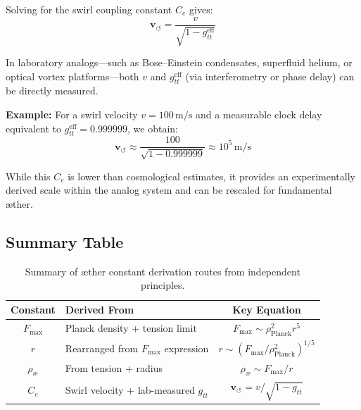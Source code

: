         Solving for the swirl coupling constant $C_e$ gives:
        \begin{equation}
            \mathbf{v}_{\scriptscriptstyle\boldsymbol{\circlearrowleft}} = \frac{v}{\sqrt{1 - g_{tt}^{\text{eff}}}}
        \end{equation}

        In laboratory analogs—such as Bose–Einstein condensates, superfluid helium, or optical vortex platforms—both $v$ and $g_{tt}^{\text{eff}}$ (via interferometry or phase delay) can be directly measured.

        \textbf{Example:} For a swirl velocity $v = 100 \, \text{m/s}$ and a measurable clock delay equivalent to $g_{tt}^{\text{eff}} = 0.999999$, we obtain:
        \begin{equation}
            \mathbf{v}_{\scriptscriptstyle\boldsymbol{\circlearrowleft}} \approx \frac{100}{\sqrt{1 - 0.999999}} \approx 10^5 \, \text{m/s}
        \end{equation}

        While this $C_e$ is lower than cosmological estimates, it provides an experimentally derived scale within the analog system and can be rescaled for fundamental æther.

        \subsection{ Summary Table}

        \begin{table}[H]
        \centering
        \renewcommand{\arraystretch}{1.2}
        \begin{tabular}{|c|l|c|}
        \hline
        \textbf{Constant} & \textbf{Derived From} & \textbf{Key Equation} \\
        \hline
        $F_{\max}$ & Planck density + tension limit & $F_{\max} \sim \rho_{\text{Planck}}^2 r^5$ \\
        $r$ & Rearranged from $F_{\max}$ expression & $r \sim \left(F_{\max} / \rho_{\text{Planck}}^2\right)^{1/5}$ \\
        $\rho_{\text{æ}}$ & From tension + radius & $\rho_{\text{æ}} \sim F_{\max} / r$ \\
        $C_e$ & Swirl velocity + lab-measured $g_{tt}$ & $\mathbf{v}_{\scriptscriptstyle\boldsymbol{\circlearrowleft}} = v / \sqrt{1 - g_{tt}}$ \\
        \hline
        \end{tabular}
        \caption{Summary of æther constant derivation routes from independent principles.}
        \end{table}


